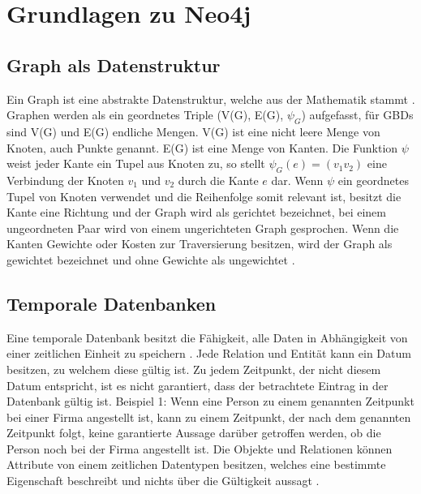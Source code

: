 

\chapter{Grundlagen zu Neo4j} %

\label{Kaptiel 2} %

\section{Graph als Datenstruktur}
Ein Graph ist eine abstrakte Datenstruktur, welche aus der Mathematik stammt \parencite{vicknair2010comparison}. Graphen werden als ein geordnetes Triple (V(G), E(G), $\psi_G$) aufgefasst, für GBDs sind V(G) und E(G) endliche Mengen. V(G) ist eine nicht leere Menge von Knoten, auch Punkte genannt. E(G) ist eine Menge von Kanten. Die Funktion $\psi$ weist jeder Kante ein Tupel aus Knoten zu, so stellt $\psi_G (e) = (v_1 v_2)$ eine Verbindung der Knoten $v_1$ und $v_2$ durch die Kante $e$ dar. Wenn $\psi$ ein geordnetes Tupel von Knoten verwendet und die Reihenfolge somit relevant ist, besitzt die Kante  eine  Richtung und der Graph wird als gerichtet bezeichnet, bei einem ungeordneten Paar wird von einem ungerichteten Graph gesprochen. Wenn die Kanten Gewichte oder Kosten zur Traversierung besitzen, wird der Graph als gewichtet bezeichnet und ohne Gewichte als ungewichtet \parencite{bondy1976graph}.

\section{Temporale Datenbanken}
Eine temporale Datenbank besitzt die Fähigkeit, alle Daten in Abhängigkeit von einer zeitlichen Einheit zu speichern \parencite{campos2016towards}. Jede Relation und Entität kann ein Datum besitzen, zu welchem diese gültig ist. Zu jedem Zeitpunkt, der nicht diesem Datum entspricht, ist es nicht garantiert, dass der betrachtete Eintrag in der Datenbank gültig ist. Beispiel 1: Wenn eine Person zu einem genannten Zeitpunkt bei einer Firma angestellt ist, kann zu einem Zeitpunkt, der nach dem genannten Zeitpunkt folgt, keine garantierte Aussage darüber getroffen werden, ob die Person noch bei der Firma angestellt ist. \newline
Die Objekte und Relationen können Attribute von einem zeitlichen Datentypen besitzen, welches eine bestimmte Eigenschaft beschreibt und nichts über die Gültigkeit aussagt \parencite{khurana2012introduction}.  
